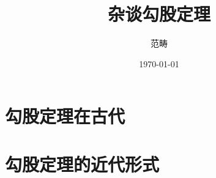 \documentclass[UTF8]{ctexart}
\title{杂谈勾股定理}
\author{范畴}
\date{\today}
\begin{document}
\maketitle
\tableofcontents
\section{勾股定理在古代}
\section{勾股定理的近代形式}

\end{document}
